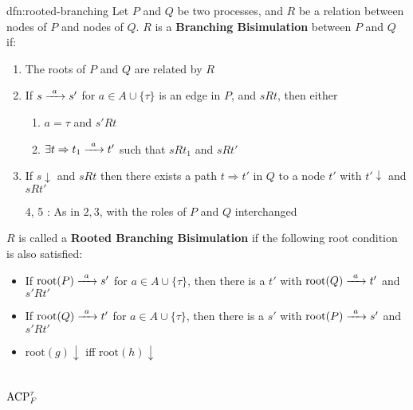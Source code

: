 \documentclass[../hons_project.tex]{subfiles}
\begin{document}
\begin{dfn}{dfn:rooted-branching}{}
   Let $P$ and $Q$ be two processes, and $R$ be a relation between nodes of $P$ and nodes of $Q$. $R$ is a \textbf{Branching Bisimulation} between $P$ and $Q$ if:
   \begin{enumerate}
      \item The roots of $P$ and $Q$ are related by $R$
      \item If $s \prightarrow{a} s'$ for $a\in A \cup \{\tau\}$ is an edge in $P$, and $s R t$, then either
	 \begin{enumerate}[label=\alph*)]
	    \item $a= \tau$ and $s' R t$
	    \item $\exists t \Rightarrow t_{1} \prightarrow{a} t'$ such that $s R t_{1}$ and $s R t'$
	 \end{enumerate}
      \item If $s \downarrow$ and $s R t$ then there exists a path $t \Rightarrow t'$ in $Q$ to a node $t'$ with $t'\downarrow$ and $s R t'$
      \item[4, 5]: As in $2, 3$, with the roles of $P$ and $Q$ interchanged
   \end{enumerate}

   \longrule{0.08ex}

   $R$ is called a \textbf{Rooted Branching Bisimulation} if the following root condition is also satisfied:
   \begin{itemize}
      \item If $\mathrm{root}(P) \prightarrow{a} s'$ for $a\in A \cup \{\tau\}$, then there is a $t'$ with $\mathrm{root}(Q)\prightarrow{a} t'$ and $s' R t'$
      \item If $\mathrm{root}(Q) \prightarrow{a} t'$ for $a\in A \cup \{\tau\}$, then there is a $s'$ with $\mathrm{root}(P)\prightarrow{a} s'$ and $s' R t'$
      \item $\mathrm{root}(g)\downarrow$ iff $\mathrm{root}(h)\downarrow$
   \end{itemize}
\end{dfn}

\section{\texorpdfstring{$\mathrm{ACP}_{F}^{\tau}$}{ACP-tf}}\label{sc:acp}
\end{document}
